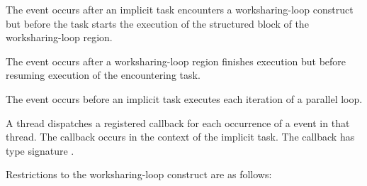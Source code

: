 \events

The  event occurs after an implicit task encounters a
worksharing-loop construct but before the task starts the execution of the structured
block of the worksharing-loop region.

The  event occurs after a worksharing-loop region finishes
execution but before resuming execution of the encountering task.

The  event occurs before an implicit task
executes each iteration of a parallel loop.


A thread dispatches a registered 
callback for each occurrence of a  
event in that thread. The callback occurs in the
context of the implicit task.  The callback has type signature
. 

\restrictions
Restrictions to the worksharing-loop construct are as follows:

